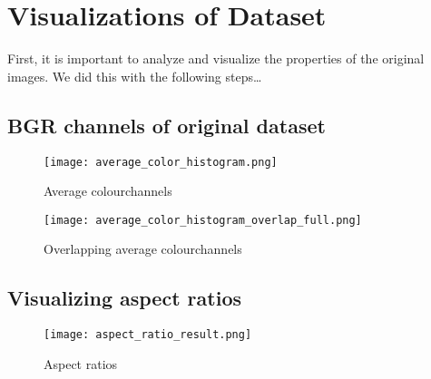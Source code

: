 \section{Visualizations of Dataset}
\begin{fullwidth}First, it is important to analyze and visualize the properties of the original images. 
We did this with the following steps\dots\end{fullwidth}

\subsection{BGR channels of original dataset}

\begin{figure}[H] %
	\texttt{[image: average\_color\_histogram.png]}
	\caption{Average colourchannels}
	\label{fig:average_color_histogram} %
\end{figure}

\begin{figure}[H] %
	\texttt{[image: average\_color\_histogram\_overlap\_full.png]}
	\caption{Overlapping average colourchannels}
	\label{fig:average_color_histogram_overlap_full} %
\end{figure}

\newpage
\subsection{Visualizing aspect ratios}

\begin{figure}[H] %
	\texttt{[image: aspect\_ratio\_result.png]}
	\caption{Aspect ratios}
	\label{fig:aspect_ratio_result} %
\end{figure}

